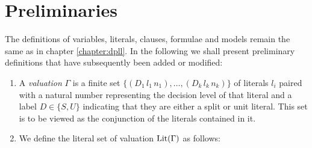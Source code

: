 \section{Preliminaries}
The definitions of variables, literals, clauses, formulae and models remain the same as in chapter \ref{chapter:dpll}. In the following we shall present preliminary definitions that have subsequently been added or modified: \\
%
%
\begin{mydef}
\hspace{3mm}
\begin{enumerate}

%
%
%
%
%
%
%
\item A \emph{valuation} $\Gamma$ is a finite set $\{ (D_1 \, l_1 \, n_1), \ldots , ( D_k \, l_k \, n_k) \}$ of literals $l_i$ paired with a natural number representing the decision level of that literal and a label $D \in \{S, U\}$ indicating that they are either a split or unit literal. This set is to be viewed as the conjunction of the literals contained in it.
%
\item We define the literal set of valuation $\mathrm{Lit}(\Gamma)$ as follows:

\end{enumerate}
\end{mydef}
